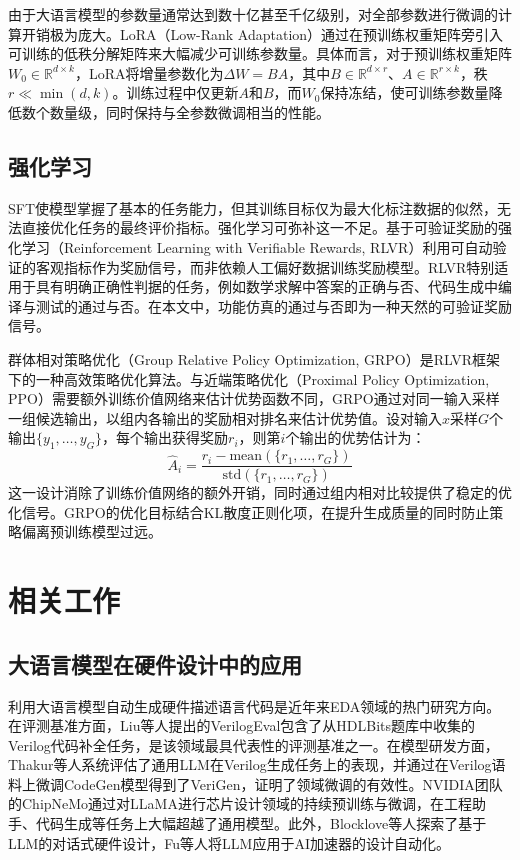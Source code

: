由于大语言模型的参数量通常达到数十亿甚至千亿级别，对全部参数进行微调的计算开销极为庞大。LoRA（Low-Rank Adaptation）通过在预训练权重矩阵旁引入可训练的低秩分解矩阵来大幅减少可训练参数量。具体而言，对于预训练权重矩阵$W_0 \in \mathbb{R}^{d \times k}$，LoRA将增量参数化为$\Delta W = BA$，其中$B \in \mathbb{R}^{d \times r}$、$A \in \mathbb{R}^{r \times k}$，秩$r \ll \min(d, k)$。训练过程中仅更新$A$和$B$，而$W_0$保持冻结，使可训练参数量降低数个数量级，同时保持与全参数微调相当的性能。

\subsection{强化学习}

SFT使模型掌握了基本的任务能力，但其训练目标仅为最大化标注数据的似然，无法直接优化任务的最终评价指标。强化学习可弥补这一不足。基于可验证奖励的强化学习（Reinforcement Learning with Verifiable Rewards, RLVR）利用可自动验证的客观指标作为奖励信号，而非依赖人工偏好数据训练奖励模型。RLVR特别适用于具有明确正确性判据的任务，例如数学求解中答案的正确与否、代码生成中编译与测试的通过与否。在本文中，功能仿真的通过与否即为一种天然的可验证奖励信号。

群体相对策略优化（Group Relative Policy Optimization, GRPO）是RLVR框架下的一种高效策略优化算法。与近端策略优化（Proximal Policy Optimization, PPO）需要额外训练价值网络来估计优势函数不同，GRPO通过对同一输入采样一组候选输出，以组内各输出的奖励相对排名来估计优势值。设对输入$x$采样$G$个输出$\{y_1, \ldots, y_G\}$，每个输出获得奖励$r_i$，则第$i$个输出的优势估计为：
\begin{equation}
  \hat{A}_i = \frac{r_i - \text{mean}(\{r_1, \ldots, r_G\})}{\text{std}(\{r_1, \ldots, r_G\})}
\end{equation}
这一设计消除了训练价值网络的额外开销，同时通过组内相对比较提供了稳定的优化信号。GRPO的优化目标结合KL散度正则化项，在提升生成质量的同时防止策略偏离预训练模型过远。


\section{相关工作}

\subsection{大语言模型在硬件设计中的应用}

利用大语言模型自动生成硬件描述语言代码是近年来EDA领域的热门研究方向。在评测基准方面，Liu等人提出的VerilogEval包含了从HDLBits题库中收集的Verilog代码补全任务，是该领域最具代表性的评测基准之一。在模型研发方面，Thakur等人系统评估了通用LLM在Verilog生成任务上的表现，并通过在Verilog语料上微调CodeGen模型得到了VeriGen，证明了领域微调的有效性。NVIDIA团队的ChipNeMo通过对LLaMA进行芯片设计领域的持续预训练与微调，在工程助手、代码生成等任务上大幅超越了通用模型。此外，Blocklove等人探索了基于LLM的对话式硬件设计，Fu等人将LLM应用于AI加速器的设计自动化。

